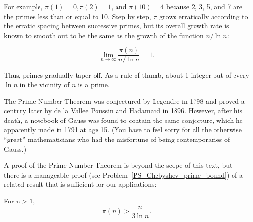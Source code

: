 For example, $\pi(1) = 0, \pi(2) = 1$, and $\pi(10) = 4$ because 2, 3,
5, and 7 are the primes less than or equal to 10.  Step by step,
$\pi$ grows erratically according to the erratic spacing between
successive primes, but its overall growth rate is known to smooth out
to be the same as the growth of the function $n/\ln n$:

\begin{theorem}
\[
\lim_{n\to\infty} \frac{\pi(n)}{n/\ln n} = 1.
\]
\end{theorem}

Thus, primes gradually taper off.  As a rule of thumb, about 1 integer
out of every $\ln n$ in the vicinity of $n$ is a prime.


The Prime Number Theorem was conjectured by Legendre in 1798 and
proved a century later by de la Vallee Poussin and Hadamard in 1896.
However, after his death, a notebook of Gauss was found to contain the
same conjecture, which he apparently made in 1791 at age 15.  (You
have to feel sorry for all the otherwise ``great'' mathematicians who
had the misfortune of being contemporaries of Gauss.)

A proof of the Prime Number Theorem is beyond the scope of this text,
but there is a manageable proof (see
Problem~\ref{PS_Chebyshev_prime_bound}) of a related result that is
sufficient for our applications:
\begin{theorem}
For $n >1$,
\[
\pi(n) > \frac{n}{3 \ln n}.
\]
\end{theorem}

